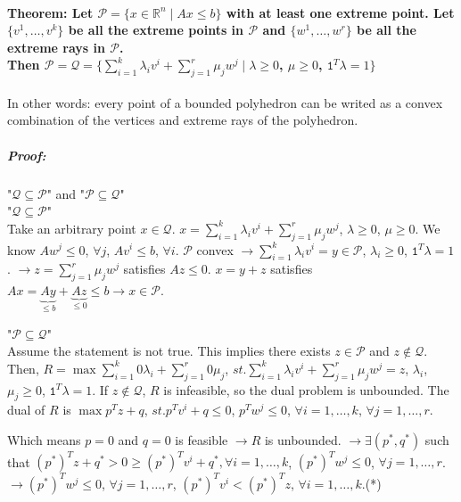 \documentclass[main]{subfiles}
\begin{document}
\paragraph{Theorem: Let $\mathcal{P} = \{x \in \mathbb{R}^n \mid Ax \leq b\}$
with at least one extreme point. Let $\{v^1, \dots, v^k\}$ be all the extreme
points in $\mathcal{P}$ and $\{w^1, \dots, w^r\}$ be all the extreme rays in
$\mathcal{P}$. \\ Then $\mathcal{P} = \mathcal{Q} = \{ \sum_{i =1}^{k}
\lambda_i v^i + \sum_{j=1}^{r} \mu_j w^j \mid \lambda \geq 0$, $\mu \geq 0$,
$\mathtt{1}^T \lambda =1 \}$}
In other words: every point of a bounded polyhedron can be writed as a convex
combination of the vertices and extreme rays of the polyhedron.

\subparagraph{Proof:} "$\mathcal{Q} \subseteq \mathcal{P}$" and "$\mathcal{P} \subseteq \mathcal{Q}$"\\

"$\mathcal{Q} \subseteq \mathcal{P}$"\\
Take an arbitrary point $x \in \mathcal{Q}$. $x = \sum_{i =1}^{k} \lambda_i v^i
+ \sum_{j=1}^{r} \mu_j w^j$, $\lambda \geq 0$, $\mu \geq 0$. We know $A w^j
\leq 0$, $\forall j$, $Av^i \leq b$, $\forall i$.
$\mathcal{P}$ convex $\rightarrow \sum_{i=1}^{k} \lambda_i v^i = y \in
\mathcal{P}$, $\lambda_i \geq 0$, $\mathtt{1}^T \lambda = 1$.
$\rightarrow z = \sum_{j = 1}^{r} \mu_j w^j$ satisfies $Az \leq 0$. $x = y + z$
satisfies $Ax = \underbrace{Ay}_{\leq b} + \underbrace{Az}_{\leq 0} \leq b
\rightarrow x \in \mathcal{P}$.

"$\mathcal{P} \subseteq \mathcal{Q}$"\\
Assume the statement is not true. This implies there exists $z \in \mathcal{P}$
and $z \notin \mathcal{Q}$.
Then, $R = \max \sum_{i = 1}^{k} 0\lambda_i + \sum_{j=1}^{r} 0 \mu_j$, $st.
\sum_{i = 1}^{k} \lambda_i v^i + \sum_{j = 1}^{r} \mu_j w^j = z$, $\lambda_i$,
$\mu_j \geq 0$, $\mathtt{1}^T \lambda = 1$. If $z \notin \mathcal{Q}$, $R$ is
infeasible, so the dual problem is unbounded. The dual of $R$ is
$\max p^T z + q$, $st. p^T v^i + q \leq 0$, $p^T w^j \leq 0$, $\forall i =1,
\dots, k$, $\forall j = 1, \dots, r$.

Which means $p = 0$ and $q = 0$ is feasible $\rightarrow R$ is unbounded.
$\rightarrow \exists (p^*, q^*)$ such that $(p^*)^T z + q^* > 0 \geq (p^*)^T
v^i + q^*, \forall i = 1, \dots, k$, $(p^*)^T w^j \leq 0$, $\forall j = 1,
\dots, r$. \\

$\rightarrow (p^*)^T w^j \leq 0$, $\forall j = 1, \dots, r$, $(p^*)^T v^i <
(p^*)^T z$, $\forall i = 1, \dots, k$.(*)
\end{document}
